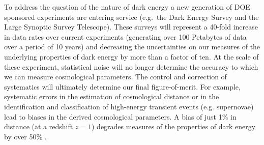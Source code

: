 \documentclass[prd,nofootbib,floatfix,11pt,tightenlines]{revtex4}
\begin{document}
To address the question of the nature of dark energy a new generation
of DOE sponsored experiments are entering service (e.g.\ the Dark
Energy Survey and the
Large Synoptic Survey Telescope).  These
surveys will represent a 40-fold increase in data rates over current
experiments (generating over 100 Petabytes of data over a period of 10
years) and decreasing the uncertainties on our measures of the
underlying properties of dark energy by more than a factor of ten.
At the scale of these experiment, statistical noise will no longer
determine the accuracy
 to which we can measure cosmological
parameters. The control and
 correction of systematics will
ultimately determine our final
 figure-of-merit. For example,
systematic errors in the estimation of cosmological distance or in the
identification and classification of high-energy transient events
(e.g. supernovae) lead to biases in the derived cosmological
parameters. A bias of just 1\% in distance (at a redshift $z=1$) degrades
measures of the properties of dark energy by over 50\%
\cite{kitching,huterer2006,nakajima2011}.
\end{document}
